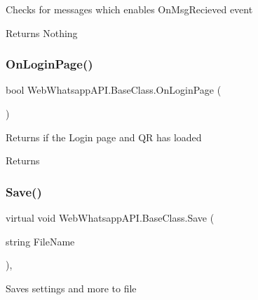 Checks for messages which enables On\+Msg\+Recieved event 

\begin{DoxyReturn}{Returns}
Nothing
\end{DoxyReturn}
\mbox{\label{class_web_whatsapp_a_p_i_1_1_base_class_ace95215a9d65215e30c8fe3582800878}} 
\subsubsection{\texorpdfstring{On\+Login\+Page()}{OnLoginPage()}}
{\footnotesize\ttfamily bool Web\+Whatsapp\+A\+P\+I.\+Base\+Class.\+On\+Login\+Page (\begin{DoxyParamCaption}{ }\end{DoxyParamCaption})\hspace{0.3cm}{\ttfamily [inline]}}



Returns if the Login page and QR has loaded 

\begin{DoxyReturn}{Returns}

\end{DoxyReturn}
\mbox{\label{class_web_whatsapp_a_p_i_1_1_base_class_a03ddf85cb437ebabb7f3444d856bd8a7}} 
\subsubsection{\texorpdfstring{Save()}{Save()}}
{\footnotesize\ttfamily virtual void Web\+Whatsapp\+A\+P\+I.\+Base\+Class.\+Save (\begin{DoxyParamCaption}\item[{string}]{File\+Name }\end{DoxyParamCaption})\hspace{0.3cm}{\ttfamily [inline]}, {\ttfamily [virtual]}}



Saves settings and more to file 


